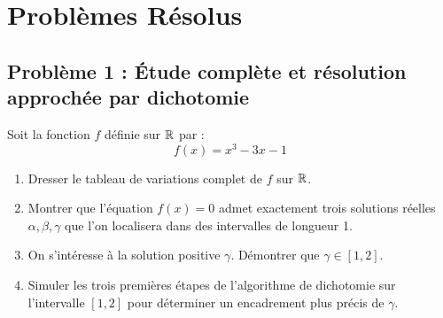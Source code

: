 \section{Problèmes Résolus}

\subsection*{Problème 1 : Étude complète et résolution approchée par dichotomie}
Soit la fonction $f$ définie sur $\mathbb{R}$ par :
\[
f(x) = x^3 - 3x - 1
\]
\begin{enumerate}
    \item Dresser le tableau de variations complet de $f$ sur $\mathbb{R}$.
    \item Montrer que l'équation $f(x) = 0$ admet exactement trois solutions réelles $\alpha, \beta, \gamma$ que l'on localisera dans des intervalles de longueur 1.
    \item On s'intéresse à la solution positive $\gamma$. Démontrer que $\gamma \in [1, 2]$.
    \item Simuler les trois premières étapes de l'algorithme de dichotomie sur l'intervalle $[1, 2]$ pour déterminer un encadrement plus précis de $\gamma$.
\end{enumerate}

